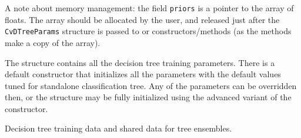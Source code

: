 \begin{description}
{A note about memory management: the field \texttt{priors} is a pointer to the array of floats. The array should be allocated by the user, and released just after the \texttt{CvDTreeParams} structure is passed to  or  constructors/methods (as the methods make a copy of the array).}
\end{description}

The structure contains all the decision tree training parameters. There is a default constructor that initializes all the parameters with the default values tuned for standalone classification tree. Any of the parameters can be overridden then, or the structure may be fully initialized using the advanced variant of the constructor.



Decision tree training data and shared data for tree ensembles.

